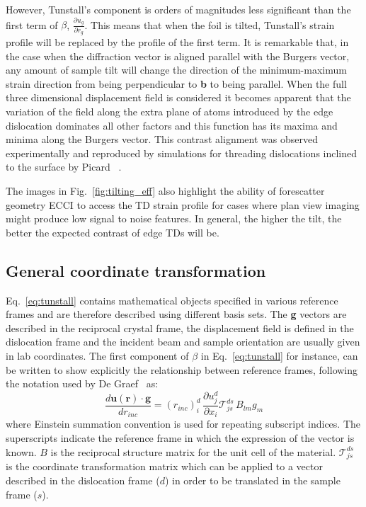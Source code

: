 However, Tunstall’s component is orders of magnitudes less significant than the first term of $\beta$, $\frac{\partial u_g}{\partial r_{g}}$. This means that when the foil is tilted, Tunstall’s strain profile will be replaced by the profile of the first term. It is remarkable that, in the case when the diffraction vector is aligned parallel with the Burgers vector, any amount of sample tilt will change the direction of the minimum-maximum strain direction from being perpendicular to \textbf{b} to being parallel.
When the full three dimensional displacement field is considered it becomes apparent that the variation of the field
along the extra plane of atoms introduced by the edge dislocation dominates all other factors and this function has its
maxima and minima along the Burgers vector. This contrast alignment was observed experimentally and reproduced
by simulations for threading dislocations inclined to the surface by Picard \etal~\cite{Picard}.

The images in Fig.~\ref{fig:tilting_eff} also highlight the ability of forescatter geometry ECCI to access the TD strain profile for cases where plan view imaging might produce low signal to noise features. In general, the higher the tilt, the better the expected contrast of edge TDs will be.




\subsection{General coordinate transformation}
\label{sec:coordinates}
Eq.~\ref{eq:tunstall} contains mathematical objects specified in various reference frames and are therefore described using different basis sets. The \textbf{g} vectors are described in the reciprocal crystal frame, the displacement field is defined in the dislocation frame and the incident beam and sample orientation are usually given in lab coordinates. The first component of $\beta$ in Eq.~\ref{eq:tunstall} for instance, can be written to show explicitly the relationship between reference frames, following the notation used by De Graef~\cite{MarcTEM03} as:
\begin{equation}
    \frac{d \mathbf{u}(\mathbf{r}) \cdot \mathbf{g}}{d r_{inc}} = (r_{inc})^d_i \, \frac{\partial u^d_j}{\partial x_i} \mathcal{T}^{ds}_{js} \, B_{lm} g_m
\end{equation}
where Einstein summation convention is used for repeating subscript indices. The superscripts indicate the reference frame in which the expression of the vector is known. $B$ is the reciprocal structure matrix for the unit cell of the material.  $\mathcal{T}^{ds}_{js}$ is the coordinate transformation matrix which can be applied to a vector described in the dislocation frame ($d$) in order to be translated in the sample frame ($s$).

